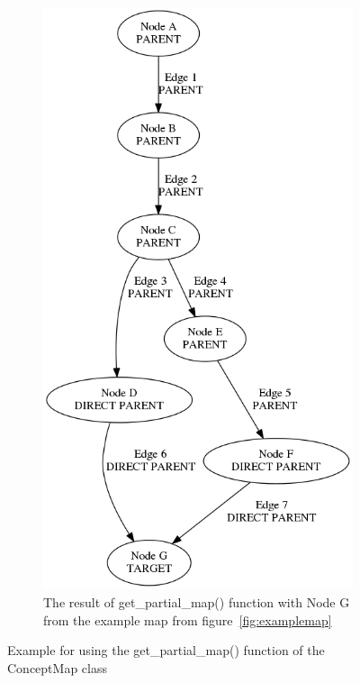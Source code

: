 \begin{figure}
\begin{subfigure}{0.4\textwidth}
        \includegraphics[height=.4\textheight]{img/examplemap_partial_g.png}
        \caption{The result of get\_partial\_map() function with Node G from the example map from figure~\protect\ref{fig:examplemap}}
        \label{fig:examplemap_partial_g}
    \end{subfigure}
    \caption{Example for using the get\_partial\_map() function of the ConceptMap class}
    \label{fig:examplemap_partial}
\end{figure}

